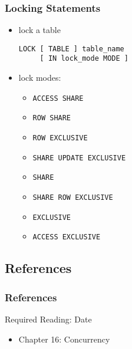 \documentclass[dvipsnames]{beamer}
\theoremstyle{plain}
\begin{document}
\begin{frame}[fragile]
  \frametitle{Locking Statements}

  \begin{itemize}\item lock a table
    \begin{lstlisting}
LOCK [ TABLE ] table_name
     [ IN lock_mode MODE ]
    \end{lstlisting}

    \item lock modes:
    \begin{itemize}
      \item \lstinline!ACCESS SHARE!
      \item \lstinline!ROW SHARE!
      \item \lstinline!ROW EXCLUSIVE!
      \item \lstinline!SHARE UPDATE EXCLUSIVE!
      \item \lstinline!SHARE!
      \item \lstinline!SHARE ROW EXCLUSIVE!
      \item \lstinline!EXCLUSIVE!
      \item \lstinline!ACCESS EXCLUSIVE!
    \end{itemize}
  \end{itemize}
\end{frame}

\subsection*{References}

\begin{frame}
  \frametitle{References}

  \begin{block}{Required Reading: Date}
    \begin{itemize}
      \item Chapter 16: \alert{Concurrency}
    \end{itemize}
  \end{block}
\end{frame}
\end{document}

